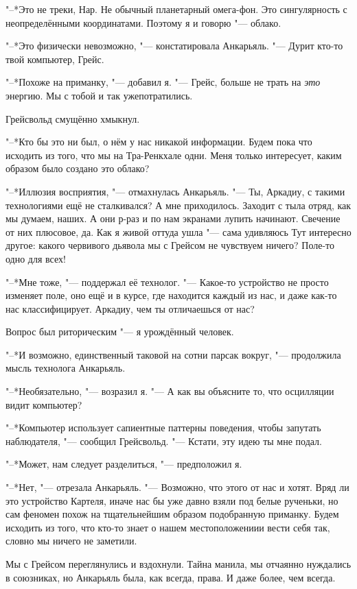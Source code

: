 "--*Это не треки, Нар.
Не обычный планетарный омега-фон.
Это сингулярность с неопределёнными координатами.
Поэтому я и говорю "--- облако.

"--*Это физически невозможно, "--- констатировала Анкарьяль.
"--- Дурит кто-то твой компьютер, Грейс.

"--*Похоже на приманку, "--- добавил я.
"--- Грейс, больше не трать на \emph{это} энергию.
Мы с тобой и так уже\ldotst потратились.

Грейсвольд смущённо хмыкнул.

"--*Кто бы это ни был, о нём у нас никакой информации.
Будем пока что исходить из того, что мы на Тра-Ренкхале одни.
Меня только интересует, каким образом было создано это облако?

"--*Иллюзия восприятия, "--- отмахнулась Анкарьяль.
"--- Ты, Аркадиу, с такими технологиями ещё не сталкивался?
А мне приходилось.
Заходит с тыла отряд, как мы думаем, наших.
А они р-раз и по нам экранами лупить начинают.
Свечение от них плюсовое, да.
Как я живой оттуда ушла "--- сама удивляюсь\ldotst
Тут интересно другое: какого червивого дьявола мы с Грейсом не чувствуем ничего?
Поле-то одно для всех!

"--*Мне тоже, "--- поддержал её технолог.
"--- Какое-то устройство не просто изменяет поле, оно ещё и в курсе, где находится каждый из нас, и даже как-то нас классифицирует.
Аркадиу, чем ты отличаешься от нас?

Вопрос был риторическим "--- я урождённый человек.

"--*И возможно, единственный таковой на сотни парсак вокруг, "--- продолжила мысль технолога Анкарьяль.

"--*Необязательно, "--- возразил я.
"--- А как вы объясните то, что осцилляции видит компьютер?

"--*Компьютер использует сапиентные паттерны поведения, чтобы запутать наблюдателя, "--- сообщил Грейсвольд.
"--- Кстати, эту идею ты мне подал.

"--*Может, нам следует разделиться, "--- предположил я.

"--*Нет, "--- отрезала Анкарьяль.
"--- Возможно, что этого от нас и хотят.
Вряд ли это устройство Картеля, иначе нас бы уже давно взяли под белые рученьки, но сам феномен похож на тщательнейшим образом подобранную приманку.
Будем исходить из того, что кто-то знает о нашем местоположении\ldotst и вести себя так, словно мы ничего не заметили.

Мы с Грейсом переглянулись и вздохнули.
Тайна манила, мы отчаянно нуждались в союзниках, но Анкарьяль была, как всегда, права.
И даже более, чем всегда.


